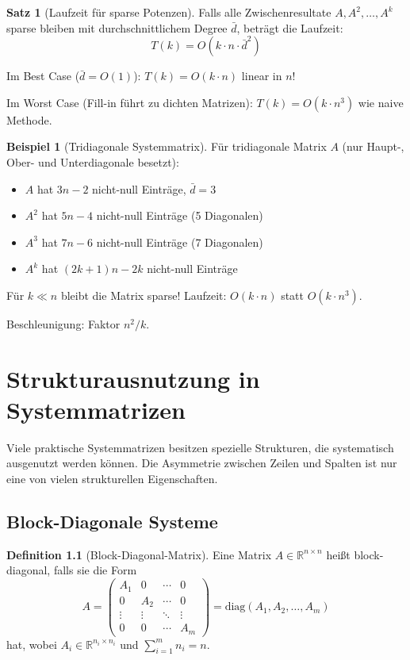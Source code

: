 ﻿\documentclass[a4paper,12pt]{report}
\theoremstyle{definition}
\newtheorem{definition}{Definition}
\newtheorem{beispiel}{Beispiel}
\newtheorem{satz}{Satz}
\begin{document}
	\begin{satz}[Laufzeit für sparse Potenzen]
		Falls alle Zwischenresultate $A, A^2, \ldots, A^k$ sparse bleiben mit durchschnittlichem Degree $\bar{d}$, beträgt die Laufzeit:
		\[
		T(k) = O(k \cdot n \cdot \bar{d}^2)
		\]
		
		Im Best Case ($\bar{d} = O(1)$): $T(k) = O(k \cdot n)$ linear in $n$!
		
		Im Worst Case (Fill-in führt zu dichten Matrizen): $T(k) = O(k \cdot n^3)$ wie naive Methode.
	\end{satz}
	
	\begin{beispiel}[Tridiagonale Systemmatrix]
		Für tridiagonale Matrix $A$ (nur Haupt-, Ober- und Unterdiagonale besetzt):
		\begin{itemize}
			\item $A$ hat $3n - 2$ nicht-null Einträge, $\bar{d} = 3$
			\item $A^2$ hat $5n - 4$ nicht-null Einträge (5 Diagonalen)
			\item $A^3$ hat $7n - 6$ nicht-null Einträge (7 Diagonalen)
			\item $A^k$ hat $(2k+1)n - 2k$ nicht-null Einträge
		\end{itemize}
		
		Für $k \ll n$ bleibt die Matrix sparse! Laufzeit: $O(k \cdot n)$ statt $O(k \cdot n^3)$.
		
		Beschleunigung: Faktor $n^2 / k$.
	\end{beispiel}
	
	\chapter{Strukturausnutzung in Systemmatrizen}
	
	Viele praktische Systemmatrizen besitzen spezielle Strukturen, die systematisch ausgenutzt werden können. Die Asymmetrie zwischen Zeilen und Spalten ist nur eine von vielen strukturellen Eigenschaften.
	
	\section{Block-Diagonale Systeme}
	
	\begin{definition}[Block-Diagonal-Matrix]
		Eine Matrix $A \in \mathbb{R}^{n \times n}$ heißt block-diagonal, falls sie die Form
		\[
		A = \begin{pmatrix}
			A_1 & 0 & \cdots & 0 \\
			0 & A_2 & \cdots & 0 \\
			\vdots & \vdots & \ddots & \vdots \\
			0 & 0 & \cdots & A_m
		\end{pmatrix} = \text{diag}(A_1, A_2, \ldots, A_m)
		\]
		hat, wobei $A_i \in \mathbb{R}^{n_i \times n_i}$ und $\sum_{i=1}^m n_i = n$.
	\end{definition}
	
\end{document}
